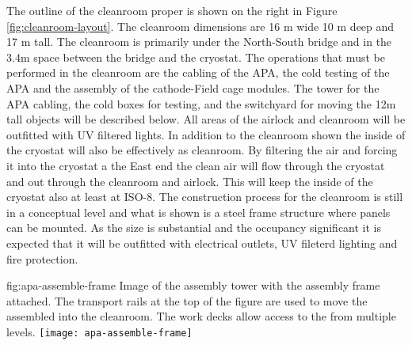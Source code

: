 The outline of the cleanroom proper is shown on the right in Figure \ref{fig:cleanroom-layout}. The cleanroom dimensions are 16 \si{m} wide 10 \si{m} deep and 17 \si{m} tall. The cleanroom is primarily under the North-South bridge and in the 3.4m space between the bridge and the cryostat. The operations that must be performed in the cleanroom are the cabling of the APA, the cold testing of the APA and the assembly of the cathode-Field cage modules. The tower for the APA cabling, the cold boxes for testing, and the switchyard for moving the 12m tall objects will be described below. All areas of the airlock and cleanroom will be outfitted with UV filtered lights. In addition to the cleanroom shown the inside of the cryostat will also be effectively as cleanroom.  By filtering the air and forcing it  into the cryostat a the East end the clean air will flow through the cryostat and out through the cleanroom and airlock. This will keep the inside of the cryostat also at least at ISO-8. The construction process for the cleanroom is still in a conceptual level and what is shown is a steel frame structure where panels can be mounted. As the size is substantial and the occupancy significant it is expected that it will be outfitted with electrical outlets, UV fileterd lighting and fire protection. 


\begin{dunefigure}{fig:apa-assemble-frame}
  {Image of the  assembly tower with the  assembly frame attached. The transport rails at the top of the figure are used to move the assembled  into the cleanroom. The work decks allow access to the  from multiple levels. }
\texttt{[image: apa-assemble-frame]}
\end{dunefigure}

